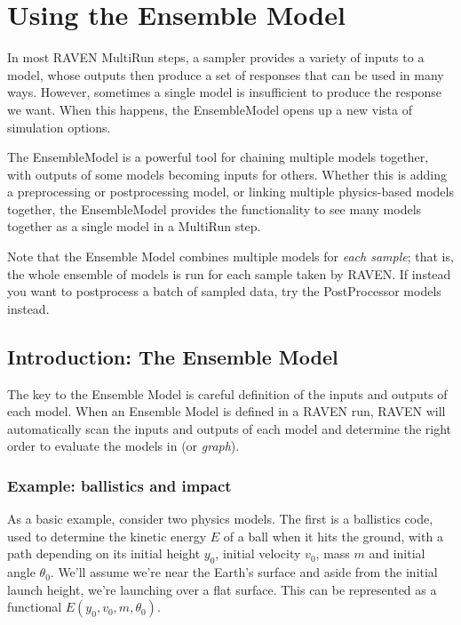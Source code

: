 \section{Using the Ensemble Model}
\label{sec:ensembleModel}


In most RAVEN MultiRun steps, a sampler provides a variety of inputs to a model, whose outputs then produce a
set of responses that can be used in many ways.  However, sometimes a single model is insufficient to produce
the response we want.  When this happens, the EnsembleModel opens up a new vista of simulation options.

The EnsembleModel is a powerful tool for chaining multiple models together, with outputs of some models
becoming inputs for others.  Whether this is adding a preprocessing or postprocessing model, or linking
multiple physics-based models together, the EnsembleModel provides the functionality to see many models
together as a single model in a MultiRun step.

Note that the Ensemble Model combines multiple models for \emph{each sample}; that is, the whole ensemble of
models is run for each sample taken by RAVEN.  If instead you want to postprocess a batch of sampled data, try
the PostProcessor models instead.

\subsection{Introduction: The Ensemble Model}
The key to the Ensemble Model is careful definition of the inputs and outputs of each model.  When an
Ensemble Model is defined in a RAVEN run, RAVEN will automatically scan the inputs and outputs of each model
and determine the right order to evaluate the models in (or \emph{graph}).

\subsubsection{Example: ballistics and impact}
As a basic example, consider two physics models.  The first is a ballistics code, used to determine the
kinetic energy $E$ of a ball when it hits the ground, with a path depending on its initial height $y_0$, initial velocity
$v_0$, mass $m$ and initial angle $\theta_0$.  We'll assume we're near the Earth's surface and aside from the initial
launch height, we're launching over a flat surface.  This can be represented as a functional $E(y_0,v_0,m,\theta_0)$.

